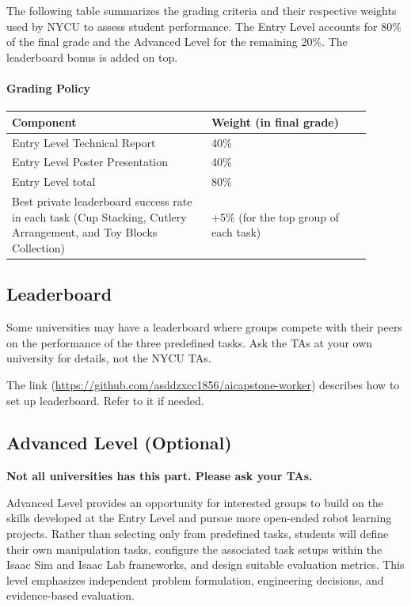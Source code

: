 \documentclass[11pt]{article}
\begin{document}
\begin{tutornote}
\label{ttn:entry-grading}
    The following table summarizes the grading criteria and their respective weights used by NYCU to assess student performance.
    The Entry Level accounts for 80\% of the final grade and the Advanced Level for the remaining 20\%. The leaderboard
    bonus is added on top.
    \paragraph{Grading Policy}
    \begin{longtable}{L{0.5\linewidth}L{0.4\linewidth}}
    \toprule
    \textbf{Component} & \textbf{Weight (in final grade)}\\
    \midrule
    Entry Level Technical Report & 40\% \\
    Entry Level Poster Presentation & 40\% \\
    \midrule
    Entry Level total & 80\% \\
    \midrule
    Best private leaderboard success rate in each task (Cup Stacking, Cutlery Arrangement, and Toy Blocks Collection) & +5\% (for the top group of each task) \\
    \bottomrule
    \end{longtable}
\end{tutornote}

\subsection{Leaderboard}
\label{sec:leaderboard}

Some universities may have a leaderboard where groups compete with their peers on the performance of the three predefined tasks. Ask the TAs at your own university for details, not the NYCU TAs.

\begin{tutornote}
The link (\url{https://github.com/asddzxcc1856/aicapstone-worker}) describes how to set up leaderboard. Refer to it if needed.
\end{tutornote}


\subsection{Advanced Level (Optional)} 

\textbf{Not all universities has this part. Please ask your TAs.}

Advanced Level provides an opportunity for interested groups to build on the skills developed at the Entry Level and pursue more open-ended robot learning projects. Rather than selecting only from predefined tasks, students will define their own manipulation tasks, configure the associated task setups within the Isaac Sim and Isaac Lab frameworks, and design suitable evaluation metrics. This level emphasizes independent problem formulation, engineering decisions, and evidence-based evaluation.
\end{document}
